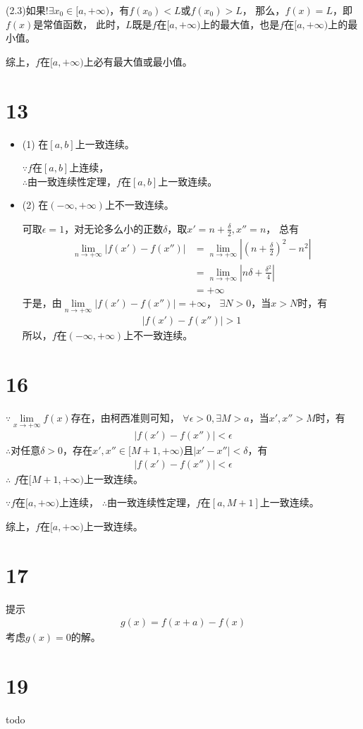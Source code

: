 \documentclass{article}
\begin{document}
(2.3)如果$!\exists x_0 \in [a, +\infty)$，有$f(x_0) < L$或$f(x_0) > L$，
那么，$f(x) = L$，即$f(x)$是常值函数，
此时，$L$既是$f$在$[a, +\infty)$上的最大值，也是$f$在$[a, +\infty)$上的最小值。

综上，$f$在$[a, +\infty)$上必有最大值或最小值。

\section*{13}

\begin{itemize}
  \item (1) 在$[a, b]$上一致连续。

        $\because f$在$[a, b]$上连续，\\
        $\therefore$由一致连续性定理，$f$在$[a, b]$上一致连续。

  \item (2) 在$(-\infty, +\infty)$上不一致连续。

        可取$\epsilon = 1$，对无论多么小的正数$\delta$，取$x' = n + \frac{\delta}{2}, x'' = n$，
        总有
        \begin{align*}
          \lim\limits_{n \to +\infty} |f(x') - f(x'')|
           & = \lim\limits_{n \to +\infty} |(n + \frac{\delta}{2})^2 - n^2| \\
           & = \lim\limits_{n \to +\infty} |n\delta + \frac{\delta^2}{4}|   \\
           & = + \infty
        \end{align*}
        于是，由$\lim\limits_{n \to +\infty} |f(x') - f(x'')| = +\infty$，
        $\exists N > 0 $，当$x > N$时，有
        \begin{align*}
          |f(x') - f(x'')| > 1
        \end{align*}
        所以，$f$在$(-\infty, +\infty)$上不一致连续。
\end{itemize}

\section*{16}

$\because \lim\limits_{x \to +\infty} f(x)$存在，由柯西准则可知，
$\forall \epsilon > 0, \exists M > a$，当$x', x'' > M$时，有
\begin{align*}
  |f(x') - f(x'')| < \epsilon
\end{align*}
$\therefore$对任意$\delta > 0$，存在$x', x'' \in [M + 1, +\infty)$且$|x' - x''| < \delta$，有
\begin{align*}
  |f(x') - f(x'')| < \epsilon
\end{align*}
$\therefore$ $f$在$[M + 1, +\infty)$上一致连续。

$\because f$在$[a, +\infty)$上连续，
$\therefore$由一致连续性定理，$f$在$[a, M + 1]$上一致连续。

综上，$f$在$[a, +\infty)$上一致连续。

\section*{17}

提示
\begin{align*}
  g(x) = f(x + a) - f(x)
\end{align*}
考虑$g(x) = 0$的解。

\section*{19}

todo
\end{document}
